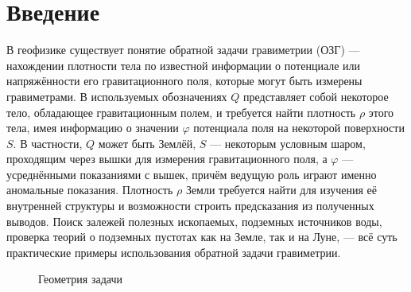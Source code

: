 \documentclass[a4paper, 12pt]{article}
\begin{document}
\tableofcontents
\newpage

\section*{Введение}
В геофизике существует понятие обратной задачи гравиметрии (ОЗГ) --- нахождении плотности тела по известной информации о потенциале или напряжённости его гравитационного поля, которые могут быть измерены гравиметрами.
В используемых обозначениях $Q$ представляет собой некоторое тело, обладающее гравитационным полем, и требуется найти плотность $\rho$ этого тела,
имея информацию о значении $\varphi$ потенциала поля на некоторой поверхности $S$.
В частности, $Q$ может быть Землёй, $S$ --- некоторым условным шаром, проходящим через вышки для измерения гравитационного поля, а $\varphi$ --- усреднёнными показаниями с вышек, причём ведущую роль играют именно аномальные показания.
Плотность $\rho$ Земли требуется найти для изучения её внутренней структуры и возможности строить предсказания из полученных выводов.
Поиск залежей полезных ископаемых, подземных источников воды, проверка теорий о подземных пустотах как на Земле, так и на Луне, --- всё суть практические примеры использования обратной задачи гравиметрии. 
\begin{figure}[h!]
  \noindent{}
  \caption{Геометрия задачи}
  \label{kvci}
  \end{figure} 
\end{document}
